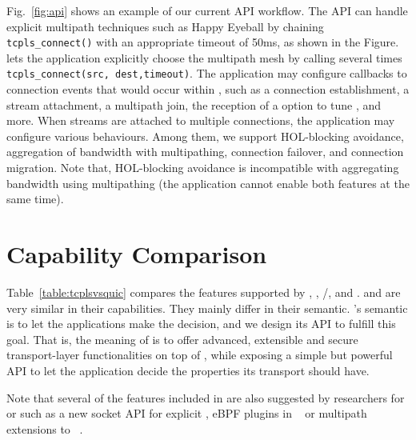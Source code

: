 Fig.~\ref{fig:api} shows an example of our current API workflow. The API can
handle explicit multipath techniques such as Happy Eyeball by chaining
\texttt{tcpls\_connect()} with an appropriate timeout of 50ms, as shown in the
Figure. \tcpls lets the application explicitly choose the multipath mesh by
calling several times \texttt{tcpls\_connect(src, dest,timeout)}. The
application may configure callbacks to connection events that would occur within
\tcpls, such as a connection establishment, a stream attachment, a multipath
join, the reception of a \tcp option to tune \tcp, and more. When 
streams are attached to multiple \tcp connections, the application may configure
various \tcpls behaviours. Among them, we support HOL-blocking avoidance,
aggregation of bandwidth with multipathing, connection failover, and connection
migration. Note that, HOL-blocking avoidance is incompatible with 
aggregating bandwidth using multipathing (the application cannot enable both
features at the same time).

\section{Capability Comparison}


Table~\ref{table:tcplsvsquic} compares the features supported by
\tcp, \mptcp, \tls/\tcp, \quic and \tcpls. \quic and \tcpls are very similar in their
capabilities. They mainly differ in their semantic. \tcpls's semantic is to let
the applications make the decision, and we design its API to fulfill this goal.
That is, the meaning of \tcpls is to offer advanced, extensible and secure
transport-layer functionalities on top of \tcp, while exposing a simple but
powerful API to let the application decide the properties its transport should
have.

Note that several of the features included in \tcpls are also suggested by researchers
for \tcp or \quic such as a new socket API for explicit \mptcp
\cite{hesmans2016enhanced}, eBPF plugins in \quic~\cite{de2019pluginizing} or multipath
extensions to \quic~\cite{viernickel2018multipath,de2017multipath,draft-liu-multipath-quic-02}.

